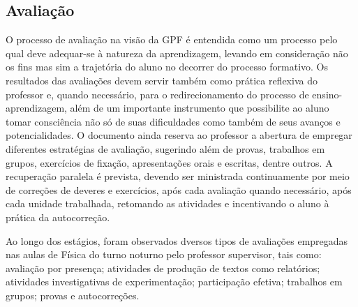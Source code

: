 \subsection{Avaliação}
O processo de avaliação na visão da \ac{GPF} é entendida como um processo pelo qual deve adequar-se à natureza da aprendizagem, levando em consideração não os fins mas sim a trajetória do aluno no decorrer do processo formativo. Os resultados das avaliações devem servir também como prática reflexiva do professor e, quando necessário, para o redirecionamento do processo de ensino-aprendizagem, além de um importante instrumento que possibilite ao aluno tomar consciência não só de suas dificuldades como também de seus avanços e potencialidades. O documento ainda reserva ao professor a abertura de empregar diferentes estratégias de avaliação, sugerindo além de provas, trabalhos em grupos, exercícios de fixação, apresentações orais e escritas, dentre outros. A recuperação paralela é prevista, devendo ser ministrada continuamente por meio de correções de deveres e exercícios, após cada avaliação quando necessário, após cada unidade trabalhada, retomando as atividades e incentivando o aluno à prática da autocorreção. 

Ao longo dos estágios, foram observados dversos tipos de avaliações empregadas nas aulas de Física do turno noturno pelo professor supervisor, tais como: avaliação por presença; atividades de produção de textos como relatórios; atividades investigativas de experimentação; participação efetiva; trabalhos em grupos; provas e autocorreções.


